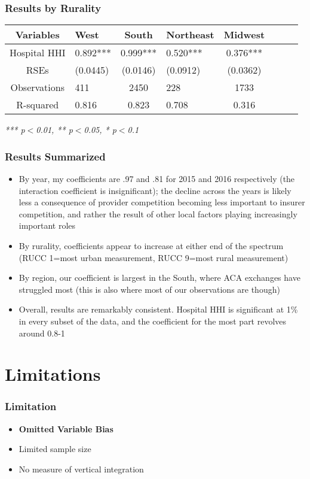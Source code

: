 \documentclass{beamer}
\begin{document}
\begin{frame}
\frametitle{Results by Rurality}
\begin{table}
\begin{tabular}{c l c l c l c | c}
\toprule
\textbf{Variables} & \textbf{West} & \textbf{South} & \textbf{Northeast} & \textbf{Midwest}\\
\midrule
Hospital HHI & 0.892*** & 0.999*** & 0.520*** & 0.376***\\
RSEs & (0.0445) & (0.0146) & (0.0912) & (0.0362) \\
Observations & 411 & 2450 & 228 & 1733 \\
R-squared & 0.816 & 0.823 & 0.708 & 0.316 \\
\bottomrule
\end{tabular}
\textit{*** p$<$0.01, ** p$<$0.05, * p$<$0.1}
\end{table}
\end{frame}

\begin{frame}
\frametitle{Results Summarized}
\begin{itemize}
\item By year, my coefficients are .97 and .81 for 2015 and 2016 respectively (the interaction coefficient is insignificant); the decline across the years is likely less a consequence of provider competition becoming less important to insurer competition, and rather the result of other local factors playing increasingly important roles
\item By rurality, coefficients appear to increase at either end of the spectrum (RUCC 1=most urban measurement, RUCC 9=most rural measurement)
\item By region, our coefficient is largest in the South, where ACA exchanges have struggled most (this is also where most of our observations are though)
\item Overall, results are remarkably consistent. Hospital HHI is significant at 1\% in every subset of the data, and the coefficient for the most part revolves around 0.8-1
\end{itemize}
\end{frame}

\section[Limitations]{Limitations}
\begin{frame}
\frametitle{Limitation}
\begin{itemize}
\item \textbf{Omitted Variable Bias}
\item Limited sample size
\item No measure of vertical integration
\end{itemize}
\end{frame}
\end{document}
